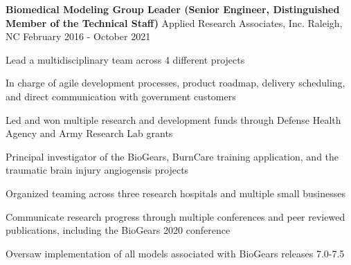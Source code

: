 
\begin{cventries}
  \cventry
    {\textbf{Biomedical Modeling Group Leader (Senior Engineer, Distinguished Member of the Technical Staff)}} %
    {Applied Research Associates, Inc.} %
    {Raleigh, NC} %
    {February 2016 - October 2021} %
    {
      \begin{cvitems} %
        \item {Lead a multidisciplinary team across 4 different projects}
        \item {In charge of agile development processes, product roadmap, delivery scheduling, and direct communication with government customers}
        \item {Led and won multiple research and development funds through Defense Health Agency and Army Research Lab grants}
        \item {Principal investigator of the BioGears, BurnCare training application, and the traumatic brain injury angiogensis projects}
        \item {Organized teaming across three research hospitals and multiple small businesses}
        \item {Communicate research progress through multiple conferences and peer reviewed publications, including the BioGears 2020 conference}
        \item {Oversaw implementation of all models associated with BioGears releases 7.0-7.5}
      \end{cvitems}
    }



\end{cventries}
